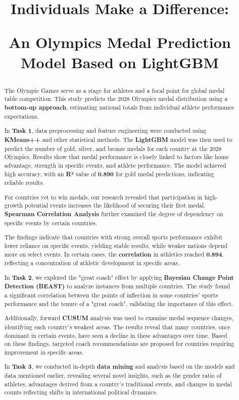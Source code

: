 \documentclass[12pt]{article}  %
\title{Individuals Make a Difference:
	
	An Olympics Medal Prediction Model Based on LightGBM}  %
\begin{document}
\begin{abstract}
	The Olympic Games serve as a stage for athletes and a focal point for global medal table competition. This study predicts the 2028 Olympics medal distribution using a \textbf{bottom-up approach}, estimating national totals from individual athlete performance expectations.
	
	In \textbf{Task 1}, data preprocessing and feature engineering were conducted using \textbf{KMeans++} and other statistical methods. The \textbf{LightGBM} model was then used to predict the number of gold, silver, and bronze medals for each country at the 2028 Olympics. Results show that medal performance is closely linked to factors like home advantage, strength in specific events, and athlete performance. The model achieved high accuracy, with an \textbf{R²} value of \textbf{0.890} for gold medal predictions, indicating reliable results.
	
	For countries yet to win medals, our research revealed that participation in high-growth potential events increases the likelihood of securing their first medal. \textbf{Spearman Correlation Analysis} further examined the degree of dependency on specific events by certain countries.
	
	The findings indicate that countries with strong overall sports performance exhibit lower reliance on specific events, yielding stable results, while weaker nations depend more on select events. In certain cases, the \textbf{correlation} in athletics reached \textbf{0.894}, reflecting a concentration of athletic development in specific areas.
	
	In \textbf{Task 2}, we explored the "great coach" effect by applying \textbf{Bayesian Change Point Detection (BEAST)} to analyze instances from multiple countries. The study found a significant correlation between the points of inflection in some countries' sports performance and the tenure of a "great coach", validating the importance of this effect.
	
	Additionally, forward \textbf{CUSUM} analysis was used to examine medal sequence changes, identifying each country's weakest areas. The results reveal that many countries, once dominant in certain events, have seen a decline in these advantages over time. Based on these findings, targeted coach recommendations are proposed for countries requiring improvement in specific areas.
	
	In \textbf{Task 3}, we conducted in-depth \textbf{data mining} and analysis based on the models and data mentioned earlier, revealing several novel insights, such as the gender ratio of athletes, advantages derived from a country's traditional events, and changes in medal counts reflecting shifts in international political dynamics.
	

\end{abstract}
\end{document}
